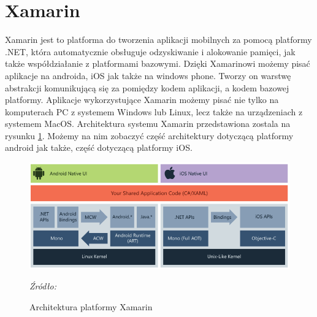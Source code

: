 \documentclass[12pt,oneside]{report}
\begin{document}
\section{Xamarin}
Xamarin jest to platforma do tworzenia aplikacji mobilnych za pomocą platformy .NET, która automatycznie obsługuje odzyskiwanie i alokowanie pamięci, jak także współdziałanie z platformami bazowymi. Dzięki Xamarinowi możemy pisać aplikacje na androida, iOS jak także na windows phone. Tworzy on warstwę abstrakcji komunikującą się za pomiędzy kodem aplikacji, a kodem bazowej platformy. Aplikacje wykorzystujące Xamarin możemy pisać nie tylko na komputerach PC z systemem Windows lub Linux, lecz także na urządzeniach z systemem MacOS. Architektura systemu Xamarin przedstawiona zostala na rysunku \ref{XamarinArchitecture}. Możemy na nim zobaczyć część architektury dotyczącą platformy android jak także, część dotyczącą platformy iOS.\cite{XamarinLearn}
\begin{figure}[H]
	\centering
	\includegraphics[scale=0.5]{xamarinArchitecture}
	\caption{Architektura platformy Xamarin}
	\textit{Źródło: \cite{XamarinLearn}}
	\label{XamarinArchitecture}
\end{figure}
\end{document}
